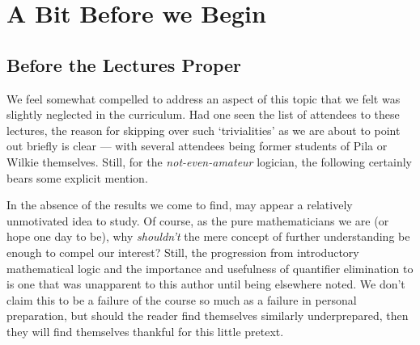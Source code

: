 %
%
%
\chapter{A Bit Before we Begin}
\label{bit-before} %



\section{Before the Lectures Proper}
We feel somewhat compelled to address an aspect of this topic that we felt was slightly neglected in the curriculum. Had one seen the list of attendees to these lectures, the reason for skipping over such `trivialities' as we are about to point out briefly is clear — with several attendees being former students of Pila or Wilkie themselves. Still, for the \emph{not-even-amateur} logician, the following certainly bears some explicit mention.

In the absence of the results we come to find, \omy may appear a relatively unmotivated idea to study. Of course, as the pure mathematicians we are (or hope one day to be), why \emph{shouldn't} the mere concept of further understanding be enough to compel our interest? Still, the progression from introductory mathematical logic and the importance and usefulness of quantifier elimination to \omy is one that was unapparent to this author until being elsewhere noted. We don't claim this to be a failure of the course so much as a failure in personal preparation, but should the reader find themselves similarly underprepared, then they will find themselves thankful for this little pretext.

